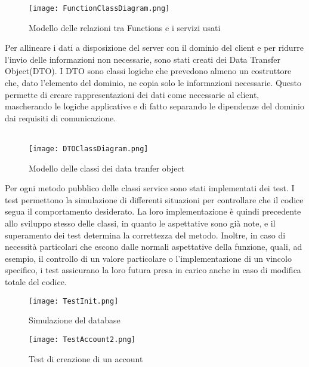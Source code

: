 \clearpage
\begin{figure}[h!]
    \begin{center}
        \texttt{[image: FunctionClassDiagram.png]}
        \caption{Modello delle relazioni tra Functions e i servizi usati}
    \end{center}
\end{figure}
Per allineare i dati a disposizione del server con il dominio del client
e per ridurre l'invio delle informazioni non necessarie, sono stati creati dei Data Transfer Object(DTO).
I DTO sono classi logiche che prevedono almeno un costruttore che, dato l'elemento del dominio, 
ne copia solo le informazioni necessarie. 
Questo permette di creare rappresentazioni dei dati come necessarie al client,
mascherando le logiche applicative e di fatto separando le dipendenze del dominio dai requisiti di comunicazione.\\
\\
\begin{figure}[h!]
    \begin{center}
        \texttt{[image: DTOClassDiagram.png]}
        \caption{Modello delle classi dei data tranfer object}
    \end{center}
\end{figure}
\clearpage
Per ogni metodo pubblico delle classi service sono stati implementati dei test.
I test permettono la simulazione di differenti situazioni per controllare che il codice segua il comportamento desiderato.
La loro implementazione è quindi precedente allo sviluppo stesso delle classi, 
in quanto le aspettative sono già note, e il superamento dei test determina la correttezza del metodo.
Inoltre, in caso di necessità particolari che escono dalle normali aspettative della funzione, 
quali, ad esempio, il controllo di un valore particolare o l'implementazione di un vincolo specifico,
i test assicurano la loro futura presa in carico anche in caso di modifica totale del codice.
\begin{figure}[h!]
    \begin{center}
        \texttt{[image: TestInit.png]}
        \caption{Simulazione del database}
    \end{center}
\end{figure}

\begin{figure}[h!]
    \begin{center}
        \texttt{[image: TestAccount2.png]}
        \caption{Test di creazione di un account}
    \end{center}
\end{figure}

